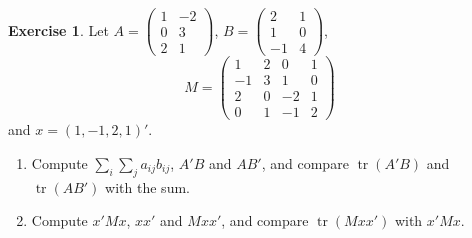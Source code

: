 \documentclass[12pt]{article}
\DeclareMathOperator{\tr}{tr}
\theoremstyle{definition}
\newtheorem{exercise}{Exercise}
\begin{document}
\begin{exercise}\label{r1-dr-trace}
Let \(A=\begin{pmatrix}1&-2\\0&3\\2&1\end{pmatrix}\), \(B=\begin{pmatrix}2&1\\1&0\\-1&4\end{pmatrix}\),
\[
M=\begin{pmatrix}1&2&0&1\\-1&3&1&0\\2&0&-2&1\\0&1&-1&2\end{pmatrix}
\]
and \(x=(1,-1,2,1)'\).
\begin{enumerate}
\item Compute \(\sum_i\sum_ja_{ij}b_{ij}\), \(A'B\) and \(AB'\), and compare \(\tr(A'B)\) and \(\tr(AB')\) with the sum.
\item Compute \(x'Mx\), \(xx'\) and \(Mxx'\), and compare \(\tr(Mxx')\) with \(x'Mx\).
\end{enumerate}
\end{exercise}
\end{document}
